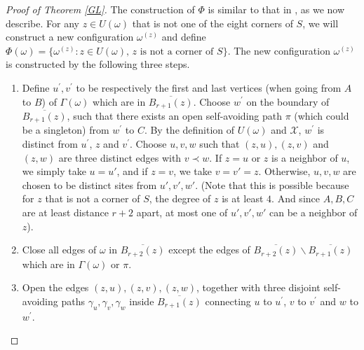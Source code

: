 \documentclass[12pt, twoside,a4paper,reqno]{amsart}
\theoremstyle{plain}
\theoremstyle{remark}
\theoremstyle{definition}
\newcommand{\ol}{\overline}
\begin{document}
\begin{proof} [Proof of Theorem \ref{GL}]
The construction of $\Phi $ is similar to that in \cite{DST}, as we now
describe. For any $z\in U(\omega)$ that is not one of the eight corners of $S$, we will construct a new
configuration $\omega ^{\left( z\right) }$ and define $\Phi (\omega) = \{ \omega^{(z)}:
z \in U(\omega)\text{, $z$ is not a corner of } S\}$. The new configuration $\omega^{(z)}$ is constructed by the following three steps.

\begin{enumerate}
\item Define $u^{\prime },v^{\prime }$
to be respectively the first and last vertices (when going from $A$ to $B$)
of $\Gamma(\omega)$ which are in $\overline{B_{r+1}\left(
z\right) }$. Choose $w^{\prime }$ on the boundary of $%
\overline{B_{r+1}\left( z\right) }$, such that there exists an open self-avoiding
path $\pi$ (which could be a singleton) from $w^{\prime }$ to $C$. By the definition of $U\left( \omega \right) $ and $%
\mathcal{X}$, $w^{\prime }$ is distinct from $u^{\prime }$, $z$
and $v^{\prime }$. Choose $u,v,w$ such that $\left( z,u\right) ,\left( z,v\right)$ and
$\left( z,w\right) $ are three distinct edges with $%
v \prec w $. If $z =u$ or $z$ is a neighbor of $u$, we simply take $u = u'$, and if $z =v$, we take
$v=v'=z$. Otherwise, $u,v,w$ are chosen to be distinct sites from $u', v',w'$.
(Note that this is possible
because for $z$ that is not a corner of $S$, the degree of $z$ is at least $4$. And since $A, B,C$ are at least distance
$r+2$ apart, at most one of $u', v',w'$ can be a neighbor of $z$).

\item Close all edges of $\omega $ in $\overline{B_{r+2}\left( z\right) }$ except the edges of $\overline{B_{r+2}\left( z\right) }\backslash
\overline{B_{r+1}\left( z\right) }$ which are in $\Gamma(\omega)$ or $\pi$.

\item Open the edges $\left( z,u\right) ,\left( z,v\right) ,\left( z,w\right) $,
  together with three disjoint self-avoiding paths $\gamma _{u},\gamma
  _{v},\gamma _{w}$ inside $\ol{B_{r+1}(z)}$ connecting $u$ to $u^{\prime }$,
  $v$ to $v^{\prime }$ and $w$ to $w^{\prime } $.
\end{enumerate}


\end{proof}
\end{document}
